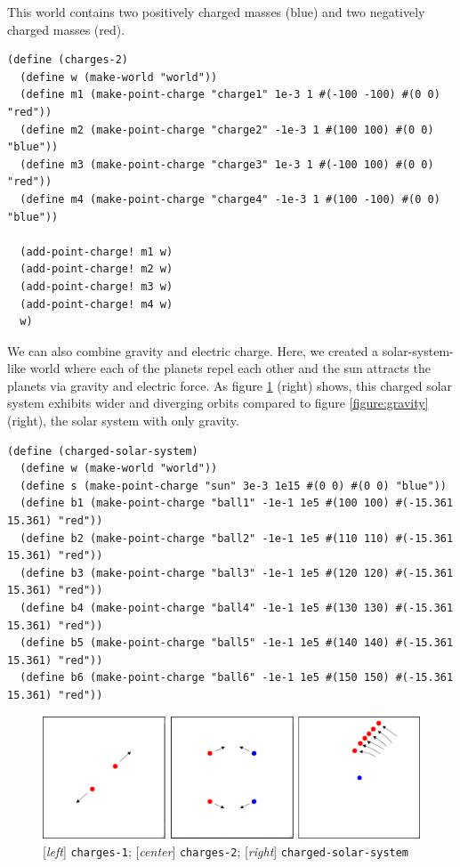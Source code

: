 \documentclass{article}
\begin{document}
This world contains two positively charged masses (blue) and two negatively
charged masses (red).

{\small\begin{verbatim}
(define (charges-2)
  (define w (make-world "world"))
  (define m1 (make-point-charge "charge1" 1e-3 1 #(-100 -100) #(0 0) "red"))
  (define m2 (make-point-charge "charge2" -1e-3 1 #(100 100) #(0 0) "blue"))
  (define m3 (make-point-charge "charge3" 1e-3 1 #(-100 100) #(0 0) "red"))
  (define m4 (make-point-charge "charge4" -1e-3 1 #(100 -100) #(0 0) "blue"))

  (add-point-charge! m1 w)
  (add-point-charge! m2 w)
  (add-point-charge! m3 w)
  (add-point-charge! m4 w)
  w)
\end{verbatim}}


We can also combine gravity and electric charge. Here, we created a
    solar-system-like world where each of the planets repel each other and the
    sun attracts the planets via gravity and electric force. As figure
    \ref{figure:charges} (right) shows, this charged solar system exhibits
    wider and diverging orbits compared to figure \ref{figure:gravity} (right),
    the solar system with only gravity.

{\small\begin{verbatim}
(define (charged-solar-system)
  (define w (make-world "world"))
  (define s (make-point-charge "sun" 3e-3 1e15 #(0 0) #(0 0) "blue"))
  (define b1 (make-point-charge "ball1" -1e-1 1e5 #(100 100) #(-15.361 15.361) "red"))
  (define b2 (make-point-charge "ball2" -1e-1 1e5 #(110 110) #(-15.361 15.361) "red"))
  (define b3 (make-point-charge "ball3" -1e-1 1e5 #(120 120) #(-15.361 15.361) "red"))
  (define b4 (make-point-charge "ball4" -1e-1 1e5 #(130 130) #(-15.361 15.361) "red"))
  (define b5 (make-point-charge "ball5" -1e-1 1e5 #(140 140) #(-15.361 15.361) "red"))
  (define b6 (make-point-charge "ball6" -1e-1 1e5 #(150 150) #(-15.361 15.361) "red"))

\end{verbatim}}

\begin{figure}[h!]
  \centering
  \includegraphics[width=\textwidth,height=\textheight,keepaspectratio]
    {figs/charges.png}
  \caption{[\textit{left}] \texttt{charges-1};
    [\textit{center}] \texttt{charges-2};
    [\textit{right}] \texttt{charged-solar-system}}
  \label{figure:charges}
\end{figure}
\end{document}
